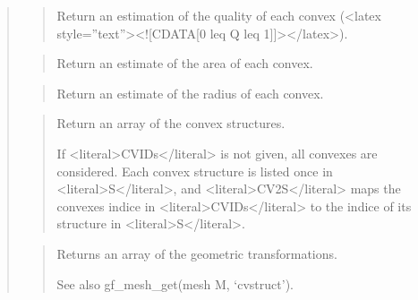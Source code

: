 \documentclass[a4paper,11pt,english]{sphinxmanual}
\begin{document}
\begin{quote}
\begin{quote}
\sphinxAtStartPar
Return an estimation of the quality of each convex (\textless{}latex style=”text”\textgreater{}\textless{}!{[}CDATA{[}0 leq Q leq 1{]}{]}\textgreater{}\textless{}/latex\textgreater{}).
\end{quote}

\sphinxAtStartPar
{}
\begin{quote}

\sphinxAtStartPar
Return an estimate of the area of each convex.
\end{quote}

\sphinxAtStartPar
{}
\begin{quote}

\sphinxAtStartPar
Return an estimate of the radius of each convex.
\end{quote}

\sphinxAtStartPar
{}
\begin{quote}

\sphinxAtStartPar
Return an array of the convex structures.

\sphinxAtStartPar
If \textless{}literal\textgreater{}CVIDs\textless{}/literal\textgreater{} is not given, all convexes are considered. Each convex
structure is listed once in \textless{}literal\textgreater{}S\textless{}/literal\textgreater{}, and \textless{}literal\textgreater{}CV2S\textless{}/literal\textgreater{} maps the convexes
indice in \textless{}literal\textgreater{}CVIDs\textless{}/literal\textgreater{} to the indice of its structure in \textless{}literal\textgreater{}S\textless{}/literal\textgreater{}.
\end{quote}

\sphinxAtStartPar
{}
\begin{quote}

\sphinxAtStartPar
Returns an array of the geometric transformations.

\sphinxAtStartPar
See also gf\_mesh\_get(mesh M, ‘cvstruct’).
\end{quote}

\sphinxAtStartPar
{}
\begin{quote}


\end{quote}
\end{quote}
\end{document}
